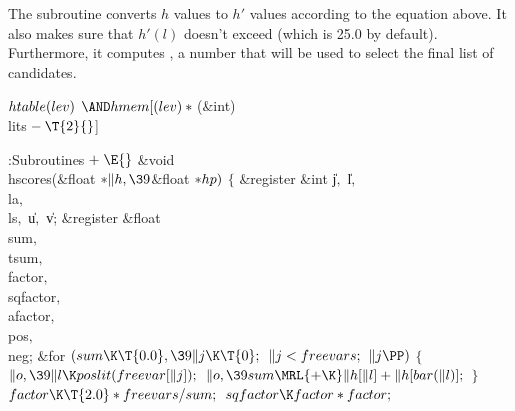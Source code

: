 The subroutine  converts $h$ values to $h'$ values
according
to the equation above. It also makes sure that $h'(l)$ doesn't
exceed  (which is 25.0 by default). Furthermore, it computes
, a number
that will be used to select
the final list of candidates.

\Y\B\4\D$\\{htable}(\\{lev})$ \5
${\AND}\\{hmem}[(\\{lev})*{}$(\&{int}) \\{lits}${}-\T{2}{}$]\par
\Y\B\4:Subroutines\X${}\mathrel+\E{}$\6
\&{void} \\{hscores}(\&{float} ${}{*}\|h,\39{}$\&{float} ${}{*}\\{hp}){}$\1\1\2%
\2\6
${}\{{}$\1\6
\&{register} \&{int} \|j${},{}$ \|l${},{}$ \\{la}${},{}$ \\{ls}${},{}$ %
\|u${},{}$ \|v;\6
\&{register} \&{float} \\{sum}${},{}$ \\{tsum}${},{}$ \\{factor}${},{}$ %
\\{sqfactor}${},{}$ \\{afactor}${},{}$ \\{pos}${},{}$ \\{neg};\7
\&{for} ${}(\\{sum}\K\T{0.0},\39\|j\K\T{0};{}$ ${}\|j<\\{freevars};{}$ ${}\|j%
\PP){}$\5
${}\{{}$\1\6
${}\|o,\39\|l\K\\{poslit}(\\{freevar}[\|j]);{}$\6
${}\|o,\39\\{sum}\MRL{+{\K}}\|h[\|l]+\|h[\\{bar}(\|l)];{}$\6
\4${}\}{}$\2\6
${}\\{factor}\K\T{2.0}*\\{freevars}/\\{sum};{}$\6
${}\\{sqfactor}\K\\{factor}*\\{factor};{}$\6
